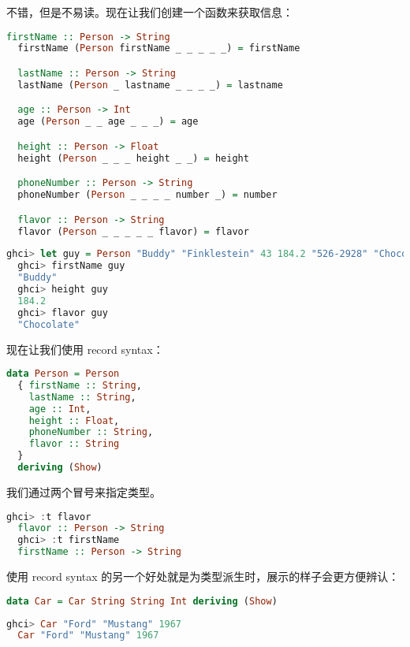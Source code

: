 \documentclass[./main.tex]{subfiles}
\begin{document}
不错，但是不易读。现在让我们创建一个函数来获取信息：

\begin{lstlisting}[language=Haskell]
  firstName :: Person -> String
  firstName (Person firstName _ _ _ _ _) = firstName

  lastName :: Person -> String
  lastName (Person _ lastname _ _ _ _) = lastname

  age :: Person -> Int
  age (Person _ _ age _ _ _) = age

  height :: Person -> Float
  height (Person _ _ _ height _ _) = height

  phoneNumber :: Person -> String
  phoneNumber (Person _ _ _ _ number _) = number

  flavor :: Person -> String
  flavor (Person _ _ _ _ _ flavor) = flavor
\end{lstlisting}

\begin{lstlisting}[language=Haskell]
  ghci> let guy = Person "Buddy" "Finklestein" 43 184.2 "526-2928" "Chocolate"
  ghci> firstName guy
  "Buddy"
  ghci> height guy
  184.2
  ghci> flavor guy
  "Chocolate"
\end{lstlisting}

现在让我们使用 record syntax：

\begin{lstlisting}[language=Haskell]
  data Person = Person
  { firstName :: String,
    lastName :: String,
    age :: Int,
    height :: Float,
    phoneNumber :: String,
    flavor :: String
  }
  deriving (Show)
\end{lstlisting}

我们通过两个冒号\acode{::}来指定类型。

\begin{lstlisting}[language=Haskell]
  ghci> :t flavor
  flavor :: Person -> String
  ghci> :t firstName
  firstName :: Person -> String
\end{lstlisting}

使用 record syntax 的另一个好处就是为类型派生时，展示的样子会更方便辨认：

\begin{lstlisting}[language=Haskell]
  data Car = Car String String Int deriving (Show)
\end{lstlisting}

\begin{lstlisting}[language=Haskell]
  ghci> Car "Ford" "Mustang" 1967
  Car "Ford" "Mustang" 1967
\end{lstlisting}
\end{document}
